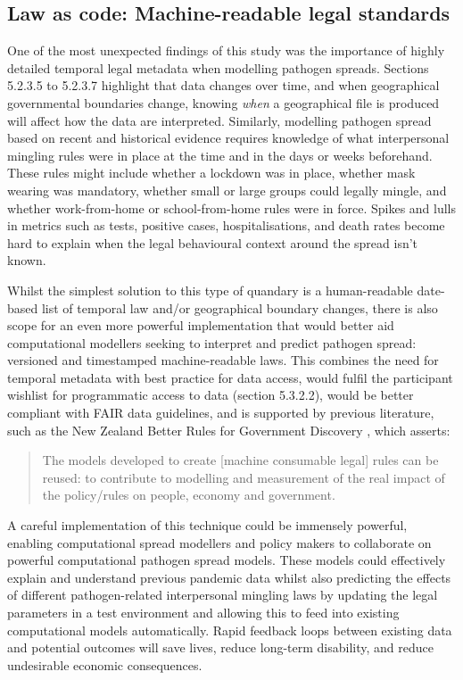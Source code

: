 \documentclass{CUP-JNL-DAP}%
\begin{document}
\subsection{Law as code: Machine-readable legal standards}

One of the most unexpected findings of this study was the importance of highly detailed temporal legal metadata when modelling pathogen spreads. Sections 5.2.3.5 to 5.2.3.7 highlight that data changes over time, and when geographical governmental boundaries change, knowing \textit{when} a geographical file is produced will affect how the data are interpreted. Similarly, modelling pathogen spread based on recent and historical evidence requires knowledge of what interpersonal mingling rules were in place at the time and in the days or weeks beforehand. These rules might include whether a lockdown was in place, whether mask wearing was mandatory, whether small or large groups could legally mingle, and whether work-from-home or school-from-home rules were in force. Spikes and lulls in metrics such as tests, positive cases, hospitalisations, and death rates become hard to explain when the legal behavioural context around the spread isn't known. 

Whilst the simplest solution to this type of quandary is a human-readable date-based list of temporal law and/or geographical boundary changes, there is also scope for an even more powerful implementation that would better aid computational modellers seeking to interpret and predict pathogen spread: versioned and timestamped machine-readable laws. This combines the need for temporal metadata with best practice for data access, would fulfil the participant wishlist for programmatic access to data (section 5.3.2.2), would be better compliant with FAIR data guidelines, and is supported by previous literature, such as the New Zealand Better Rules for Government Discovery \cite{better_rules_machine_legislation}, which asserts: 

\blockquote{The models developed to create [machine consumable legal] rules can be reused: to contribute to modelling
and measurement of the real impact of the policy/rules on people, economy and
government.}

A careful implementation of this technique could be immensely powerful, enabling computational spread modellers and policy makers to collaborate on powerful computational pathogen spread models. These models could effectively explain and understand previous pandemic data whilst also predicting the effects of different pathogen-related interpersonal mingling laws by updating the legal parameters in a test environment and allowing this to feed into existing computational models automatically. Rapid feedback loops between existing data and potential outcomes will save lives, reduce long-term disability, and reduce undesirable economic consequences. 
\end{document}
